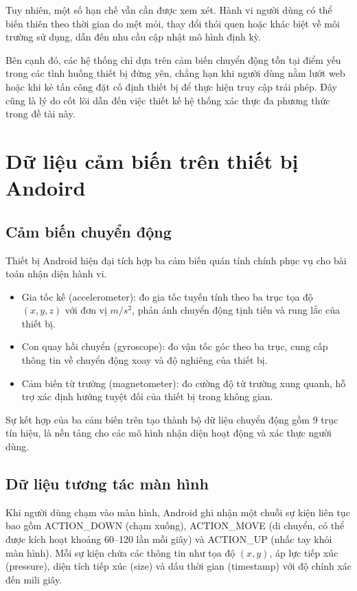 \documentclass[../DoAn.tex]{subfiles}
\begin{document}
    Tuy nhiên, một số hạn chế vẫn cần được xem xét. Hành vi người dùng có thể biến thiên theo thời gian do mệt mỏi, thay đổi thói quen hoặc khác biệt về môi trường sử dụng, dẫn đến nhu cầu cập nhật mô hình định kỳ.
    
    Bên cạnh đó, các hệ thống chỉ dựa trên cảm biến chuyển động tồn tại điểm yếu trong các tình huống thiết bị đứng yên, chẳng hạn khi người dùng nằm lướt web hoặc khi kẻ tấn công đặt cố định thiết bị để thực hiện truy cập trái phép. Đây cũng là lý do cốt lõi dẫn đến việc thiết kế hệ thống xác thực đa phương thức trong đề tài này.

    \section{Dữ liệu cảm biến trên thiết bị Andoird}

    \subsection{Cảm biến chuyển động}

    Thiết bị Android hiện đại tích hợp ba cảm biến quán tính chính phục vụ cho bài toán nhận diện hành vi.
    
    \begin{itemize}
        \item Gia tốc kế (accelerometer): đo gia tốc tuyến tính theo ba trục tọa độ $(x, y, z)$ với đơn vị $m/s^2$, phản ánh chuyển động tịnh tiến và rung lắc của thiết bị.
        
        \item Con quay hồi chuyển (gyroscope): đo vận tốc góc theo ba trục, cung cấp thông tin về chuyển động xoay và độ nghiêng của thiết bị.
        
        \item Cảm biến từ trường (magnetometer): đo cường độ từ trường xung quanh, hỗ trợ xác định hướng tuyệt đối của thiết bị trong không gian.
    \end{itemize}
    
    Sự kết hợp của ba cảm biến trên tạo thành bộ dữ liệu chuyển động gồm 9 trục tín hiệu, là nền tảng cho các mô hình nhận diện hoạt động và xác thực người dùng.
    
    \subsection{Dữ liệu tương tác màn hình}

    Khi người dùng chạm vào màn hình, Android ghi nhận một chuỗi sự kiện liên tục bao gồm ACTION\_DOWN (chạm xuống), ACTION\_MOVE (di chuyển, có thể được kích hoạt khoảng 60--120 lần mỗi giây) và ACTION\_UP (nhấc tay khỏi màn hình). Mỗi sự kiện chứa các thông tin như tọa độ $(x, y)$, áp lực tiếp xúc (pressure), diện tích tiếp xúc (size) và dấu thời gian (timestamp) với độ chính xác đến mili giây.
    
\end{document}
